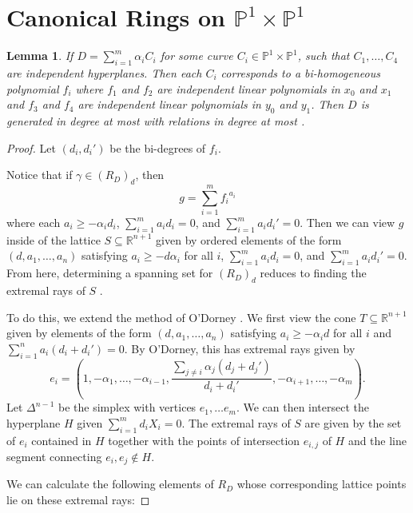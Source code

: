 \documentclass{amsart}
\theoremstyle{plain}
\newtheorem{lem}[thm]{Lemma}
\theoremstyle{definition}
\theoremstyle{remark}
\numberwithin{equation}{section}
\newcommand\bp{{\mathbb P}}
\begin{document}
\section{Canonical Rings on \texorpdfstring{$\bp^1 \times \bp^1$}{}}
\begin{lem}
If $D=\sum_{i=1}^m \alpha_i C_i$ for some curve $C_i\in \mathbb{P}^1\times \mathbb{P}^1$, such that $C_1, \ldots, C_4$ are independent hyperplanes.  Then each $C_i$ corresponds to a bi-homogeneous polynomial $f_i$ where $f_1$ and $f_2$ are independent linear polynomials in $x_0$ and $x_1$ and $f_3$ and $f_4$ are independent linear polynomials in $y_0$ and $y_1$.  Then $D$ is generated in degree at most  with relations in degree at most .
\end{lem}
\begin{proof}
Let $(d_i, d_i')$ be the bi-degrees of $f_i$. 

Notice that if $\gamma \in (R_D)_d$, then 
\[
	g = \sum_{i=1}^m {f_i}^{a_i}
\]
where each $a_i \ge - \alpha_i d_i$, $\sum_{i=1}^m a_i d_i = 0$, and $\sum_{i=1}^m a_i d_i' = 0$.  Then we can view $g$ inside of the lattice
$S\subseteq \mathbb{R}^{n+1}$ given by ordered elements of the form $(d, a_1, \ldots, a_n)$ satisfying $a_i \ge - d \alpha_i$ for all $i$, $\sum_{i=1}^m a_i d_i = 0$, and $\sum_{i=1}^m a_i d_i' = 0$. 
From here, determining a spanning set for $(R_D)_d$ reduces to finding the extremal rays of $S$ .  

To do this, we extend the method of O'Dorney .  We first view the cone $T\subseteq \mathbb{R}^{n+1}$ given by elements of the form $(d, a_1, \ldots, a_n)$ satisfying $a_i \ge -\alpha_i d$ for all $i$ and $\sum_{i=1}^n a_i (d_i + d_i') =0$.  By O'Dorney, this has extremal rays given by 
\[
	e_i = (1, -\alpha_1, \ldots, -\alpha_{i-1}, \frac{\sum_{j \ne i} \alpha_j(d_j+ d_j')}{d_i + d_i'}, -\alpha_{i+1}, \ldots, - \alpha_m).
\]
Let $\Delta^{n-1}$ be the simplex with vertices $e_1, \ldots e_m$.  We can then intersect the hyperplane $H$ given $\sum_{i=1}^m  d_i X_i = 0$.  The extremal rays of $S$ are given by the set of $e_i$ contained in $H$ together with the points of intersection $e_{i,j}$ of $H$ and the line segment connecting $e_i, e_j \not \in H$.

 We can calculate the following elements of $R_D$ whose corresponding lattice points lie on these extremal rays:


\end{proof}
\end{document}
